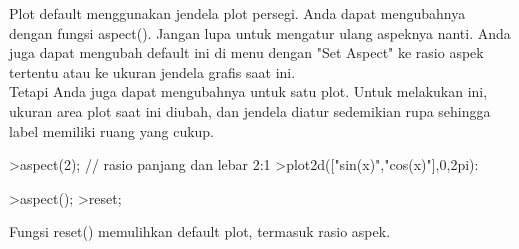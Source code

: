 \documentclass[12pt,Times new roman,letterpaper]{book}
\begin{document}
\begin{eulernootebook}
\begin{eulercomment}
\begin{eulercomment}
\begin{eulernootebook}
\begin{eulercomment}
\begin{eulercomment}
\begin{eulercomment}
\begin{eulercomment}
\begin{eulercomment}
\begin{eulercomment}
\begin{eulercomment}
\begin{eulernotebook}
\begin{eulercomment}
\end{eulercomment}
\begin{eulercomment}
Plot default menggunakan jendela plot persegi. Anda dapat mengubahnya
dengan fungsi aspect(). Jangan lupa untuk mengatur ulang aspeknya
nanti. Anda juga dapat mengubah default ini di menu dengan "Set
Aspect" ke rasio aspek tertentu atau ke ukuran jendela grafis saat
ini.\\
Tetapi Anda juga dapat mengubahnya untuk satu plot. Untuk melakukan
ini, ukuran area plot saat ini diubah, dan jendela diatur sedemikian
rupa sehingga label memiliki ruang yang cukup.
\end{eulercomment}
\begin{eulerprompt}
>aspect(2); // rasio panjang dan lebar 2:1
>plot2d(["sin(x)","cos(x)"],0,2pi):
\end{eulerprompt}
\begin{eulerprompt}
>aspect();
>reset;
\end{eulerprompt}
\begin{eulercomment}
Fungsi reset() memulihkan default plot, termasuk rasio aspek.


\end{eulercomment}
\end{eulernotebook}
\end{eulercomment}
\end{eulercomment}
\end{eulercomment}
\end{eulercomment}
\end{eulercomment}
\end{eulercomment}
\end{eulercomment}
\end{eulernootebook}
\end{eulercomment}
\end{eulercomment}
\end{eulernootebook}
\end{document}
